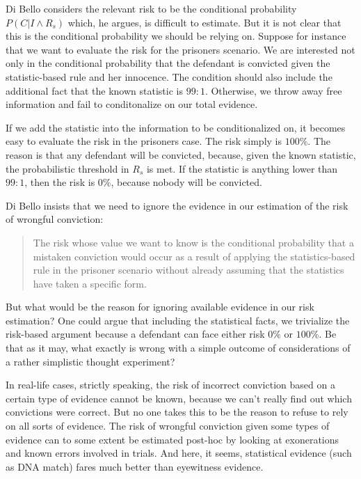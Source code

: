 \documentclass{article}
\begin{document}
Di Bello considers the relevant risk to be  the conditional probability $P(C\vert I\wedge R_{s})$ which, he argues, is difficult to estimate. But it is not clear that this is the conditional probability we should be relying on.  Suppose for instance  that we want to evaluate the risk for the prisoners scenario. We are interested not only in the conditional probability that the defendant is convicted given the statistic-based rule and her innocence. The condition should also include the additional fact that the known statistic is $99:1$. Otherwise, we throw away free information and fail to conditonalize on our total evidence. 
 
 If we add the  statistic into the information to be conditionalized on, it becomes easy to evaluate the risk in the prisoners case. The risk simply  is $100 \%$. The reason is that any defendant will be convicted, because, given the known statistic,  the probabilistic threshold in $R_{s}$ is met.  If the statistic is anything lower than $99:1$, then the risk is $0 \%$, because nobody will be convicted. 
 
Di Bello insists that we need to  ignore the evidence in our estimation of the risk of wrongful conviction:
 \begin{quotation}
 The risk whose value we want to know is the conditional probability that a mistaken conviction would occur as a result of applying the statistics-based rule in the prisoner scenario without already assuming that the statistics have taken a specific form.	

\noindent   \citep[20]{dibello2019TrialStatisticsHigh}
 \end{quotation}
 
 \noindent But what would be the reason for ignoring available evidence in our risk estimation?  One could argue that including the statistical facts, we trivialize the risk-based argument because a defendant can face either risk $0 \%$ or $100 \%$. Be that as it may, what exactly is wrong with a simple outcome of considerations of a rather simplistic thought experiment?

  In real-life cases, strictly speaking, the  risk of incorrect conviction based on a certain type of evidence  cannot be known, because we can't really find out which convictions were correct. But no one takes this to be the reason to refuse to rely on all sorts of evidence.  The risk of wrongful conviction given some types of evidence can to some extent be estimated post-hoc by looking at exonerations and known errors involved in trials. And here, it seems, statistical evidence (such as DNA match) fares much better than eyewitness evidence. 
\end{document}
